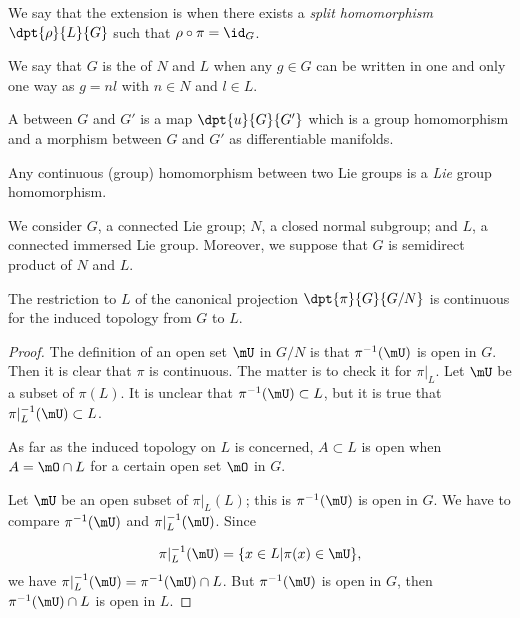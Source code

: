 We say that the extension is  when there exists a \emph{split homomorphism} $\dpt{\rho}{L}{G}$ such that $\rho\circ\pi=\id_G$.

\begin{definition}
	We say that $G$ is the  of $N$ and $L$ when any $g\in G$ can be written in one and only one way as $g=nl$ with $n\in N$ and $l\in L$.
\end{definition}


\begin{definition}
	A  between $G$ and $G'$ is a map $\dpt{u}{G}{G'}$ which is a group homomorphism and a morphism between $G$ and $G'$ as differentiable manifolds.
\end{definition}

\begin{lemma}
	Any continuous (group) homomorphism between two Lie groups is a \emph{Lie} group homomorphism.
\end{lemma}

We consider $G$, a connected Lie group; $N$, a closed normal subgroup; and $L$, a connected immersed Lie group. Moreover, we suppose that $G$ is semidirect product of $N$ and $L$.

\begin{proposition}
	The restriction to $L$ of the canonical projection $\dpt{\pi}{G}{G/N}$ is continuous for the induced topology from $G$ to $L$.
\end{proposition}
\begin{proof}
	The definition of an open set $\mU$ in $G/N$ is that $\pi^{-1}(\mU)$ is open in $G$. Then it is clear that $\pi$ is continuous. The matter is to check it for $\pi|_L$. Let $\mU$ be a subset of $\pi(L)$. It is unclear that $\pi^{-1}(\mU)\subset L$, but it is true that $\pi|_L^{-1}(\mU)\subset L$.

	As far as the induced topology on $L$ is concerned, $A\subset L$ is open when $A=\mO\cap L$ for a certain open set $\mO$ in $G$.

	Let $\mU$ be an open subset of $\pi|_L(L)$; this is $\pi^{-1}(\mU)$ is open in $G$. We have to compare $\pi^{-1}(\mU)$ and $\pi|_L^{-1}(\mU)$. Since

	\[
		\pi|_L^{-1}(\mU)=\{x\in L|\pi(x)\in\mU\},
	\]
	we have $\pi|_L^{-1}(\mU)=\pi^{-1}(\mU)\cap L$. But $\pi^{-1}(\mU)$ is open in $G$, then $\pi^{-1}(\mU)\cap L$ is open in $L$.
\end{proof}

